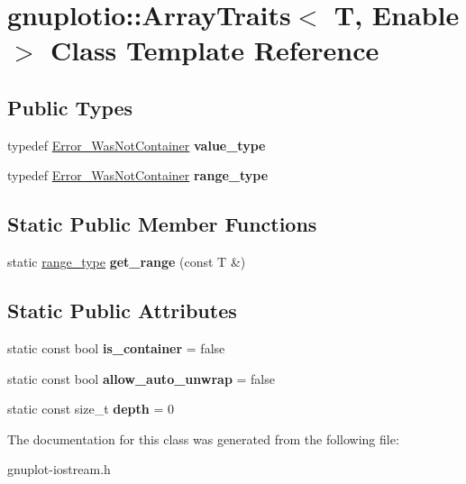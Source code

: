 \hypertarget{classgnuplotio_1_1ArrayTraits}{}\section{gnuplotio\+:\+:Array\+Traits$<$ T, Enable $>$ Class Template Reference}
\label{classgnuplotio_1_1ArrayTraits}
\subsection*{Public Types}
\begin{DoxyCompactItemize}
\item 
\mbox{\label{classgnuplotio_1_1ArrayTraits_a3bcae12a7bf42af90f4946acc66f27e0}} 
typedef \hyperlink{structgnuplotio_1_1Error__WasNotContainer}{Error\+\_\+\+Was\+Not\+Container} {\bfseries value\+\_\+type}
\item 
\mbox{\label{classgnuplotio_1_1ArrayTraits_ae53464a5175c03deec403392b8dcb3c5}} 
typedef \hyperlink{structgnuplotio_1_1Error__WasNotContainer}{Error\+\_\+\+Was\+Not\+Container} {\bfseries range\+\_\+type}
\end{DoxyCompactItemize}
\subsection*{Static Public Member Functions}
\begin{DoxyCompactItemize}
\item 
\mbox{\label{classgnuplotio_1_1ArrayTraits_aee31432f330f9f9e4f5af628641181f7}} 
static \hyperlink{structgnuplotio_1_1Error__WasNotContainer}{range\+\_\+type} {\bfseries get\+\_\+range} (const T \&)
\end{DoxyCompactItemize}
\subsection*{Static Public Attributes}
\begin{DoxyCompactItemize}
\item 
\mbox{\label{classgnuplotio_1_1ArrayTraits_ac5d19b25086565613c305960bd9d4a78}} 
static const bool {\bfseries is\+\_\+container} = false
\item 
\mbox{\label{classgnuplotio_1_1ArrayTraits_a354d64663551a34c36c5fa7823859668}} 
static const bool {\bfseries allow\+\_\+auto\+\_\+unwrap} = false
\item 
\mbox{\label{classgnuplotio_1_1ArrayTraits_a6fbd8c815e595f4efbcafd9b0eeb06f2}} 
static const size\+\_\+t {\bfseries depth} = 0
\end{DoxyCompactItemize}


The documentation for this class was generated from the following file\+:\begin{DoxyCompactItemize}
\item 
gnuplot-\/iostream.\+h\end{DoxyCompactItemize}
